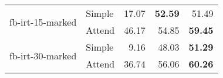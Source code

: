 \begin{tabular}{| l | l | r | r | r |}
    \multirow{2}{*}{fb-irt-15-marked}
    & Simple & 17.07 & \textbf{52.59} & 51.49 \\
    & Attend & 46.17 & 54.85 & \textbf{59.45} \\ \hline

    \multirow{2}{*}{fb-irt-30-marked}
    & Simple &  9.16 & 48.03 & \textbf{51.29} \\
    & Attend & 36.74 & 56.06 & \textbf{60.26} \\ \hline

\end{tabular}
